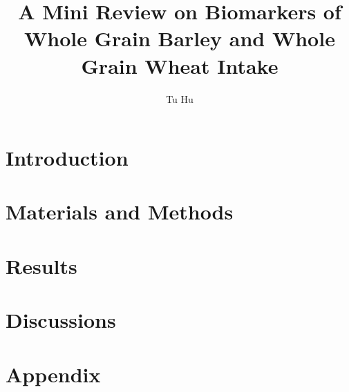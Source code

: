 \documentclass[]{article}
\title{A Mini Review on Biomarkers of Whole Grain Barley and Whole Grain Wheat Intake}
\author{Tu Hu}
\begin{document}
\maketitle

\begin{abstract}

\end{abstract}

\section{Introduction}


\section{Materials and Methods}


\section{Results}


\section{Discussions}

\section{Appendix}
\end{document}
